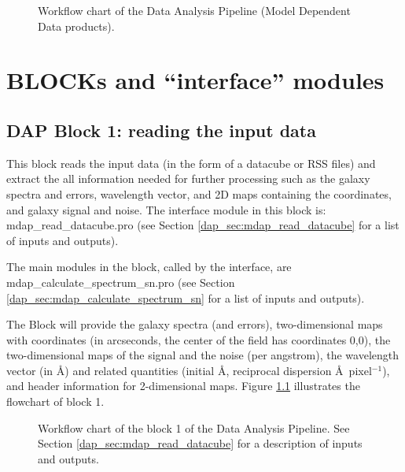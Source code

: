 \documentclass[11pt]{book}
\begin{document}
\begin{figure}
\begin{center}
\caption{Workflow chart of the Data Analysis Pipeline (Model Dependent Data products).}
 \label{dap_fig:dap_workflow_2}
\end{center}
\end{figure}

\chapter{BLOCKs and ``interface'' modules}
\label{dap_chap:blocks}
\section{DAP Block 1: reading the input data}
\label{dap_sec:block1}

This block reads the input data (in the form of a datacube or RSS
files) and extract the all information needed for further processing
such as the galaxy spectra and errors, wavelength vector, and 2D maps
containing the coordinates, and galaxy signal and noise. The interface
module in this block is: mdap\_read\_datacube.pro (see Section
\ref{dap_sec:mdap_read_datacube} for a list of inputs and outputs).

The main modules in the block, called by the interface, are
mdap\_calculate\_spectrum\_sn.pro (see Section
\ref{dap_sec:mdap_calculate_spectrum_sn} for a list of inputs and
outputs).

The Block will provide the galaxy spectra (and errors),
two-dimensional maps with coordinates (in arcseconds, the center of
the field has coordinates 0,0), the two-dimensional maps of the signal
and the noise (per angstrom), the wavelength vector (in \AA) and
related quantities (initial \AA, reciprocal dispersion
\AA\ pixel$^{-1}$), and header information for 2-dimensional
maps. Figure \ref{dap_fig:block1} illustrates the flowchart of block
1.


\begin{figure}
\begin{center}
\caption{Workflow chart of the block 1 of the Data Analysis
  Pipeline. See Section \ref{dap_sec:mdap_read_datacube} for a
  description of inputs and outputs.}
 \label{dap_fig:block1}
\end{center}
\end{figure}
\end{document}
